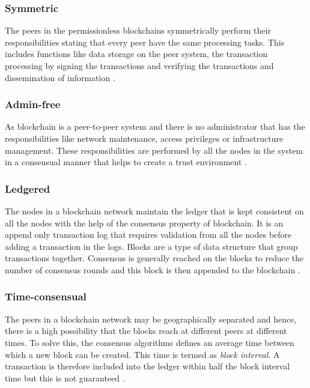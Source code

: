 \documentclass[
  a4paper,  %
  twoside,  %
  bibliography=totoc,
  headsepline,
  cleardoublepage=empty,
  parskip=half,
  draft=false
]{scrbook}
\begin{document}
\subsubsection{Symmetric}
The peers in the permissionless blockchains symmetrically perform their responsibilities stating that every peer have the same processing tasks. This includes functions like data storage on the peer system, the transaction processing by signing the transactions and verifying the transactions and dissemination of information \cite{Salt}.

\subsubsection{Admin-free}
As blockchain is a peer-to-peer system and there is no administrator that has the responsibilities like network maintenance, access privileges or infrastructure management. These responsibilities are performed by all the nodes in the system in a consensual manner that helps to create a trust environment \cite{Salt}.

\subsubsection{Ledgered}
The nodes in a blockchain network maintain the ledger that is kept consistent on all the nodes with the help of the consensus property of blockchain. It is an append only transaction log that requires validation from all the nodes before adding a transaction in the logs. Blocks are a type of data structure that group transactions together. Consensus is generally reached on the blocks to reduce the number of consensus rounds and this block is then appended to the blockchain \cite{Salt}.

\subsubsection{Time-consensual}
The peers in a blockchain network may be geographically separated and hence, there is a high possibility that the blocks reach at different peers at different times. To solve this, the consensus algorithms defines an average time between which a new block can be created. This time is termed as \textit{block interval}. A transaction is therefore included into the ledger within half the block interval time but this is not guaranteed \cite{Salt}.
\end{document}
